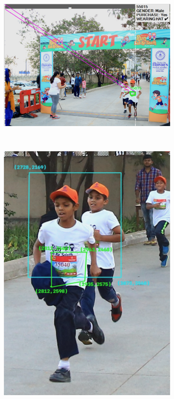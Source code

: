 \begin{figure}[p]
  \centering
  
  \begin{subfigure}[b]{0.8\textwidth}
    \includegraphics[width=\textwidth]{images/dataset/BadTagging_TooFar}
  \end{subfigure}\\
  \vspace{1cm}
  \hspace{\fill}
  \begin{subfigure}[b]{0.3\textwidth}
    \includegraphics[width=\textwidth]{images/dataset/BadTagging_Overlap}

\end{subfigure}
\end{figure}
